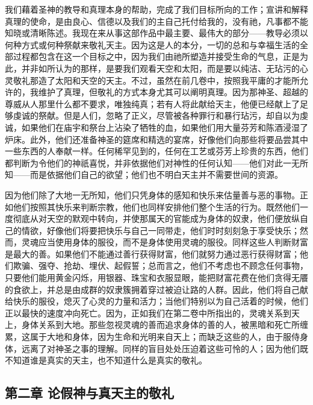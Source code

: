 我们藉着圣神的教导和真理本身的帮助，完成了我们目标所向的工作；宣讲和解释真理的使命，是由良心、信德以及我们的主自己托付给我的，没有祂，凡事都不能知晓或清晰陈述。我现在来从事这部作品中最主要、最伟大的部分——教导必须以何种方式或何种祭献来敬礼天主。因为这是人的本分，一切的总和与幸福生活的全部过程都包含在这一个目标之中，因为我们由祂所塑造并接受生命的气息，正是为此，并非如所认为的那样，是要我们观看天空和太阳，而是要以纯洁、无玷污的心灵敬礼那造了太阳和天空的天主。不过，虽然在前几卷中，按照我平庸的才能所允许的，我维护了真理，但敬礼的方式本身尤其可以阐明真理。因为那神圣、超越的尊威从人那里什么都不要求，唯独纯真；若有人将此献给天主，他便已经献上了足够虔诚的祭献。但是人们，忽略了正义，尽管被各种罪行和暴行玷污，却自以为虔诚，如果他们在庙宇和祭台上沾染了牺牲的血，如果他们用大量芬芳和陈酒浸湿了炉床。此外，他们还准备神圣的筵席和精选的宴席，好像他们向那些将要品尝其中一些东西的人奉献一样。任何稀罕见到的，任何在工艺或芬芳上珍贵的东西，他们都判断为令他们的神祇喜悦，并非依据他们对神性的任何认知——他们对此一无所知——而是依据他们自己的欲望；他们也不明白天主并不需要世间的资源。\par

因为他们除了大地一无所知，他们只凭身体的感知和快乐来估量善与恶的事物。正如他们按照其快乐来判断宗教，他们也同样安排他们整个生活的行为。既然他们一度彻底从对天空的默观中转向，并使那属天的官能成为身体的奴隶，他们便放纵自己的情欲，好像他们将要把快乐与自己一同带走，他们时时刻刻急于享受快乐；然而，灵魂应当使用身体的服役，而不是身体使用灵魂的服役。同样这些人判断财富是最大的善。如果他们不能通过善行获得财富，他们就努力通过恶行获得财富；他们欺骗、强夺、抢劫、埋伏、起假誓；总而言之，他们不考虑也不顾念任何事物，只要他们能用黄金闪烁，用银器、珠宝和衣服显眼，能把财富花费在他们贪得无餍的食欲上，并总是由成群的奴隶簇拥着穿过被迫让路的人群。因此，他们将自己献给快乐的服役，熄灭了心灵的力量和活力；当他们特别以为自己活着的时候，他们正以最快的速度冲向死亡。因为，正如我们在第二卷中所指出的，灵魂关系到天上，身体关系到大地。那些忽视灵魂的善而追求身体的善的人，被黑暗和死亡所缠累，这属于大地和身体，因为生命和光明来自天上；而缺乏这些的人，由于服侍身体，远离了对神圣之事的理解。同样的盲目处处压迫着这些可怜的人；因为他们既不知道谁是真实的天主，也不知道什么是真实的敬礼。\par


\subsection{第二章 论假神与真天主的敬礼}

